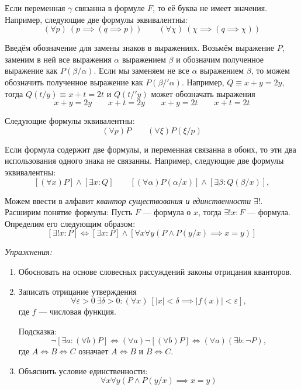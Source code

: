 Если переменная $\gamma$ связанна в формуле $F$, то её буква не имеет значения.
Например, следующие две формулы эквивалентны:
\[
	(\forall p)~(p\implies (q\implies p))\qquad
	(\forall \chi)~(\chi\implies (q\implies\chi))
\]

Введём обозначение для замены знаков в выражениях.
Возьмём выражение $P$, заменим в ней все выражения $\alpha$ выражением $\beta$ и
обозначим полученное выражение как $P(\beta/\alpha)$.
Если мы заменяем не все $\alpha$ выражением $\beta$, то можем обозначить полученное
выражение как $P(\beta/'\alpha)$.
Например, $Q\equiv x+y=2y$, тогда $Q(t/y)\equiv x+t=2t$ и $Q(t/'y)$ может
обозначать выражения
\[
	x+y=2y\qquad x+t=2y\qquad x+y=2t\qquad x+t=2t
\]

Следующие формулы эквивалентны:
\[
	(\forall p)P\qquad (\forall\xi)P(\xi/p)
\]

Если формула содержит две формулы, и переменная
связанна в обоих, то эти два использования
одного знака не связанны.
Например, следующие две формулы эквивалентны:
\[
	[(\forall x)P]\land[\exists x:Q]\qquad
	[(\forall \alpha)P(\alpha/x)]\land[\exists \beta:Q(\beta/x)],
\]

\label{page:exists_only}
Можем ввести в алфавит {\it квантор существования и единственности} $\exists!$.
Расширим понятие формулы: Пусть $F$ --- формула о $x$,
тогда ${\exists! x:F}$ --- формула. Определим его следующим образом:
\[
	[\exists! x:P]\iff[\exists x:P]\land
	[\forall x\forall y(P\land P(y/x)\implies x=y)]
\]

\vspace{1em}
{\it Упражнения:}
\begin{enumerate}
	\item{}Обосновать на основе словесных рассуждений законы отрицания
	кванторов\label{ex:quantor_neg_def}.
	\item{}Записать отрицание утверждения
	\[
		\forall \varepsilon>0~\exists \delta>0:
		(\forall x)~[|x|<\delta\implies |f(x)|<\varepsilon],
	\]
	где $f$ --- числовая функция.

	Подсказка:
	\[
		\lnot[\exists a:(\forall b)P]\iff(\forall a)\lnot[(\forall b)P]\iff
		(\forall a)(\exists b:\lnot P),
	\]
	где $A\iff B\iff C$ означает $A\iff B$ и $B\iff C$.

	\item{}Объяснить условие единственности:
	\[
		\forall x\forall y(P\land P(y/x)\implies x=y)
	\]
\end{enumerate}
